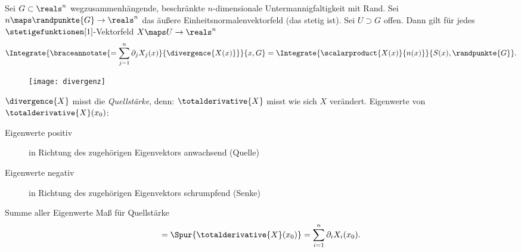 \begin{satz}\label{integralsatz_gauss}
  Sei \( G\subset \reals^n \) wegzusammenhängende, beschränkte \( n \)-dimensionale Untermannigfaltigkeit mit Rand. Sei \( n\maps \randpunkte{G}\to \reals^n \) das äußere Einheitsnormalenvektorfeld (das stetig ist). Sei \( U\supset G \) offen. Dann gilt für jedes \( \stetigefunktionen[1] \)-Vektorfeld \( X\maps U\to \reals^n \)
  \begin{equation*}
    \Integrate{\braceannotate{=\sum_{j=1}^{n}\partial_j X_j(x)}{\divergence{X(x)}}}{x,G}=\Integrate{\scalarproduct{X(x)}{n(x)}}{S(x),\randpunkte{G}}.
  \end{equation*}
\end{satz}
\begin{figure}[H]
  \centering
  \texttt{[image: divergenz]}
  \label{fig:divergenz}
\end{figure}
\( \divergence{X} \) misst die \emph{Quellstärke}, denn: \( \totalderivative{X} \) misst wie sich \( X \) verändert. Eigenwerte von \( \totalderivative{X}(x_0) \): 
\begin{description}
  \item[Eigenwerte positiv] \tto in Richtung des zugehörigen Eigenvektors anwachsend (Quelle)
  \item[Eigenwerte negativ] \tto in Richtung des zugehörigen Eigenvektors schrumpfend (Senke)
\end{description}
Summe aller Eigenwerte \teq Maß für Quellstärke
\begin{equation*}
  =\Spur{\totalderivative{X}(x_0)}=\sum_{i=1}^{n}\partial_i X_i(x_0).
\end{equation*}